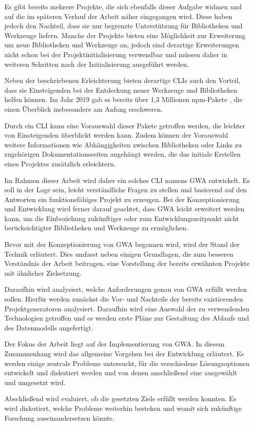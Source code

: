 Es gibt bereits mehrere Projekte, die sich ebenfalls dieser Aufgabe widmen und auf die im späteren Verlauf der Arbeit näher eingegangen wird. Diese haben jedoch den Nachteil, dass sie nur begrenzte Unterstützung für Bibliotheken und Werkzeuge liefern. Manche der Projekte bieten eine Möglichkeit zur Erweiterung um neue Bibliotheken und Werkzeuge an, jedoch sind derartige Erweiterungen nicht schon bei der Projektinitialisierung verwendbar und müssen daher in weiteren Schritten nach der Initialisierung ausgeführt werden.

Neben der beschriebenen Erleichterung bieten derartige \gls{CLI}s auch den Vorteil, dass sie Einsteigenden bei der Entdeckung neuer Werkzeuge und Bibliotheken helfen können. Im Jahr 2019 gab es bereits über 1,3 Millionen \gls{npm}-Pakete \cite{npm_package_count}, die einen Überblick insbesondere am Anfang erschweren.

Durch ein \gls{CLI} kann eine Vorauswahl dieser Pakete getroffen werden, die leichter von Einsteigenden überblickt werden kann. Zudem können der Vorauswahl weitere Informationen wie Abhängigkeiten zwischen Bibliotheken oder Links zu zugehörigen Dokumentationsseiten angehängt werden, die das initiale Erstellen eines Projektes zusätzlich erleichtern.

Im Rahmen dieser Arbeit wird daher ein solches \gls{CLI} namens \gls{GWA} entwickelt. Es soll in der Lage sein, leicht verständliche Fragen zu stellen und basierend auf den Antworten ein funktionsfähiges Projekt zu erzeugen. Bei der Konzeptionierung und Entwicklung wird ferner darauf geachtet, dass \gls{GWA} leicht erweitert werden kann, um die Einbeziehung zukünftiger oder zum Entwicklungszeitpunkt nicht berücksichtigter Bibliotheken und Werkzeuge zu ermöglichen.

Bevor mit der Konzeptionierung von \gls{GWA} begonnen wird, wird der Stand der Technik erläutert. Dies umfasst neben einigen Grundlagen, die zum besseren Verständnis der Arbeit beitragen, eine Vorstellung der bereits erwähnten Projekte mit ähnlicher Zielsetzung.

Daraufhin wird analysiert, welche Anforderungen genau von \gls{GWA} erfüllt werden sollen. Hierfür werden zunächst die Vor- und Nachteile der bereits existierenden Projektgeneratoren analysiert. Daraufhin wird eine Auswahl der zu verwendenden Technologien getroffen und es werden erste Pläne zur Gestaltung des Ablaufs und des Datenmodells angefertigt.

Der Fokus der Arbeit liegt auf der Implementierung von \gls{GWA}. In diesem Zusammenhang wird das allgemeine Vorgehen bei der Entwicklung erläutert. Es werden einige zentrale Probleme untersucht, für die verschiedene Lösungsoptionen entwickelt und diskutiert werden und von denen anschließend eine ausgewählt und umgesetzt wird.

Abschließend wird evaluiert, ob die gesetzten Ziele erfüllt werden konnten. Es wird diskutiert, welche Probleme weiterhin bestehen und womit sich zukünftige Forschung auseinandersetzen könnte.